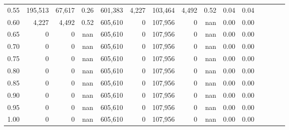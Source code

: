 \begin{tabular}{rrrcrrrrrrrrrrr}
0.55 &  195,513 &  67,617 &                                       0.26 &  601,383 &    4,227 &  103,464 &    4,492 &  0.52 &  0.04 &                         0.04 \\
0.60 &    4,227 &   4,492 &                                       0.52 &  605,610 &        0 &  107,956 &        0 &   nan &  0.00 &                         0.00 \\
0.65 &        0 &       0 &                                        nan &  605,610 &        0 &  107,956 &        0 &   nan &  0.00 &                         0.00 \\
0.70 &        0 &       0 &                                        nan &  605,610 &        0 &  107,956 &        0 &   nan &  0.00 &                         0.00 \\
0.75 &        0 &       0 &                                        nan &  605,610 &        0 &  107,956 &        0 &   nan &  0.00 &                         0.00 \\
0.80 &        0 &       0 &                                        nan &  605,610 &        0 &  107,956 &        0 &   nan &  0.00 &                         0.00 \\
0.85 &        0 &       0 &                                        nan &  605,610 &        0 &  107,956 &        0 &   nan &  0.00 &                         0.00 \\
0.90 &        0 &       0 &                                        nan &  605,610 &        0 &  107,956 &        0 &   nan &  0.00 &                         0.00 \\
0.95 &        0 &       0 &                                        nan &  605,610 &        0 &  107,956 &        0 &   nan &  0.00 &                         0.00 \\
1.00 &        0 &       0 &                                        nan &  605,610 &        0 &  107,956 &        0 &   nan &  0.00 &                         0.00 \\
\bottomrule
\end{tabular}
